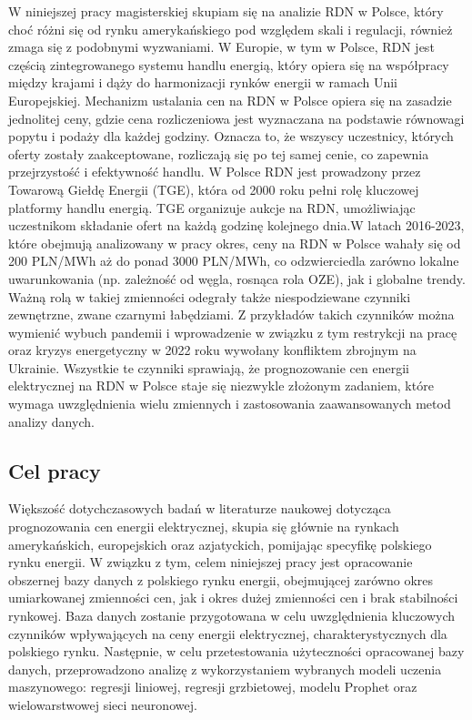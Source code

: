 W niniejszej pracy magisterskiej skupiam się na analizie RDN w Polsce, który choć różni się od rynku amerykańskiego pod względem skali i regulacji, również zmaga się z podobnymi wyzwaniami. W Europie, w tym w Polsce, RDN jest częścią zintegrowanego systemu handlu energią, który opiera się na współpracy między krajami i dąży do harmonizacji rynków energii w ramach Unii Europejskiej. Mechanizm ustalania cen na RDN w Polsce opiera się na zasadzie jednolitej ceny, gdzie cena rozliczeniowa jest wyznaczana na podstawie równowagi popytu i podaży dla każdej godziny. Oznacza to, że wszyscy uczestnicy, których oferty zostały zaakceptowane, rozliczają się po tej samej cenie, co zapewnia przejrzystość i efektywność handlu. W Polsce RDN jest prowadzony przez Towarową Giełdę Energii (TGE), która od 2000 roku pełni rolę kluczowej platformy handlu energią. TGE organizuje aukcje na RDN, umożliwiając uczestnikom składanie ofert na każdą godzinę kolejnego dnia.W latach 2016-2023, które obejmują analizowany w pracy okres, ceny na RDN w Polsce wahały się od 200 PLN/MWh aż do ponad 3000 PLN/MWh, co odzwierciedla zarówno lokalne uwarunkowania (np. zależność od węgla, rosnąca rola OZE), jak i globalne trendy. Ważną rolą w takiej zmienności odegrały także niespodziewane czynniki zewnętrzne, zwane czarnymi łabędziami. Z przykładów takich czynników można wymienić wybuch pandemii i wprowadzenie w związku z tym restrykcji na pracę oraz kryzys energetyczny w 2022 roku wywołany konfliktem zbrojnym na Ukrainie. Wszystkie te czynniki sprawiają, że prognozowanie cen energii elektrycznej na RDN w Polsce staje się niezwykle złożonym zadaniem, które wymaga uwzględnienia wielu zmiennych i zastosowania zaawansowanych metod analizy danych.

\subsection*{Cel pracy}
\label{ch:cel_pracy}

Większość dotychczasowych badań w literaturze naukowej dotycząca prognozowania cen energii elektrycznej, skupia się głównie na rynkach amerykańskich, europejskich oraz azjatyckich, pomijając specyfikę polskiego rynku energii. W związku z tym, celem niniejszej pracy jest opracowanie obszernej bazy danych z polskiego rynku energii, obejmującej zarówno okres umiarkowanej zmienności cen, jak i okres dużej zmienności cen i brak stabilności rynkowej. Baza danych zostanie przygotowana w celu uwzględnienia kluczowych czynników wpływających na ceny energii elektrycznej, charakterystycznych dla polskiego rynku. Następnie, w celu przetestowania użyteczności opracowanej bazy danych, przeprowadzono analizę z wykorzystaniem wybranych modeli uczenia maszynowego: regresji liniowej, regresji grzbietowej, modelu Prophet oraz wielowarstwowej sieci neuronowej.